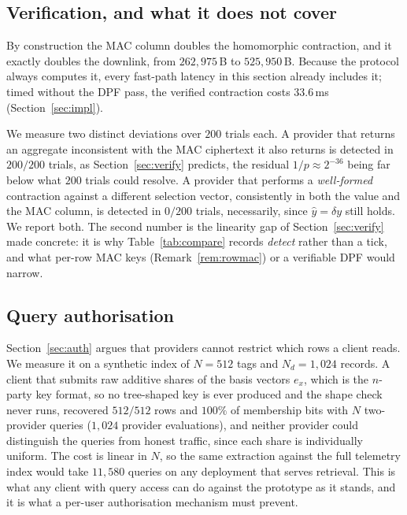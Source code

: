 \documentclass[a4paper,fleqn]{cas-dc}
\begin{document}
\subsection{Verification, and what it does not cover}
By construction the MAC column doubles the homomorphic contraction, and it
exactly doubles the downlink, from $262{,}975$\,B to $525{,}950$\,B. Because
the protocol always computes it, every fast-path latency in this section
already includes it; timed without the DPF pass, the verified contraction
costs $33.6$\,ms (Section~\ref{sec:impl}).

We measure two distinct deviations over $200$ trials each. A provider that
returns an aggregate inconsistent with the MAC ciphertext it also returns is
detected in $200/200$ trials, as Section~\ref{sec:verify} predicts, the
residual $1/p\approx2^{-36}$ being far below what $200$ trials could resolve.
A provider that performs a \emph{well-formed} contraction against a different
selection vector, consistently in both the value and the MAC column, is
detected in $0/200$ trials, necessarily, since $\hat{y}=\delta y$ still holds.
We report both. The second number is the linearity gap of
Section~\ref{sec:verify} made concrete: it is why Table~\ref{tab:compare}
records \emph{detect} rather than a tick, and what per-row MAC keys
(Remark~\ref{rem:rowmac}) or a verifiable DPF would narrow.

\subsection{Query authorisation}
\label{sec:authresult}
Section~\ref{sec:auth} argues that providers cannot restrict which rows a
client reads. We measure it on a synthetic index of $N=512$ tags and
$N_d=1{,}024$ records. A client that submits raw additive shares of the basis
vectors $e_x$, which is the $n$-party key format, so no tree-shaped key is
ever produced and the shape check never runs, recovered $512/512$ rows and
$100\%$ of membership bits with $N$ two-provider queries ($1{,}024$ provider
evaluations), and neither provider could distinguish the queries from honest
traffic, since each share is individually uniform. The cost is linear in $N$,
so the same extraction against the full telemetry index would take $11{,}580$
queries on any deployment that serves retrieval. This is what any client with
query access can do against the prototype as it stands, and it is what a
per-user authorisation mechanism must prevent.
\end{document}
